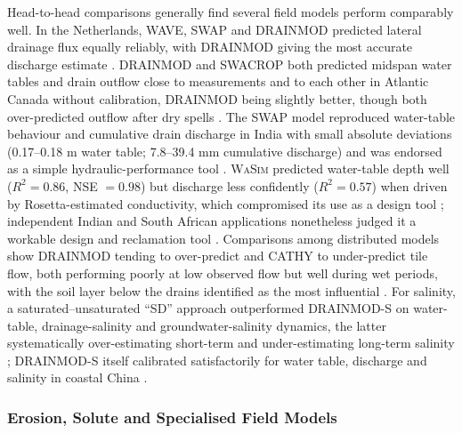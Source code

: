 Head-to-head comparisons generally find several field models perform comparably well. In the Netherlands, WAVE, SWAP and \textsc{DRAINMOD} predicted lateral drainage flux equally reliably, with \textsc{DRAINMOD} giving the most accurate discharge estimate \parencite{ElSadek2001}. \textsc{DRAINMOD} and SWACROP both predicted midspan water tables and drain outflow close to measurements and to each other in Atlantic Canada without calibration, \textsc{DRAINMOD} being slightly better, though both over-predicted outflow after dry spells \parencite{Prasher1996}. The SWAP model reproduced water-table behaviour and cumulative drain discharge in India with small absolute deviations (0.17--0.18 m water table; 7.8--39.4 mm cumulative discharge) and was endorsed as a simple hydraulic-performance tool \parencite{Verma2014}. \textsc{WaSim} predicted water-table depth well ($R^2=0.86$, NSE $=0.98$) but discharge less confidently ($R^2=0.57$) when driven by Rosetta-estimated conductivity, which compromised its use as a design tool \parencite{Malota2022}; independent Indian and South African applications nonetheless judged it a workable design and reclamation tool \parencite{Hirekhan2007,Malota2024}. Comparisons among distributed models show DRAINMOD tending to over-predict and CATHY to under-predict tile flow, both performing poorly at low observed flow but well during wet periods, with the soil layer below the drains identified as the most influential \parencite{Muma2017}. For salinity, a saturated--unsaturated ``SD'' approach outperformed \textsc{DRAINMOD-S} on water-table, drainage-salinity and groundwater-salinity dynamics, the latter systematically over-estimating short-term and under-estimating long-term salinity \parencite{Nozari2021}; \textsc{DRAINMOD-S} itself calibrated satisfactorily for water table, discharge and salinity in coastal China \parencite{Feng2018}.

\subsubsection{Erosion, Solute and Specialised Field Models}

